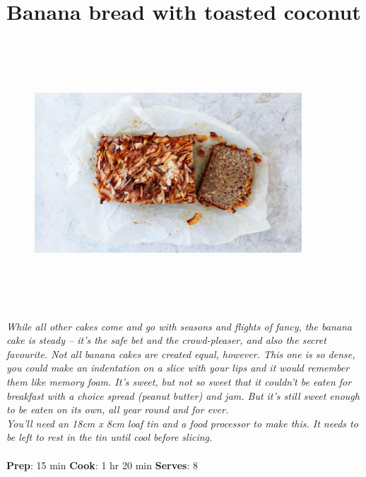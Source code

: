 \documentclass{book}
\begin{document}
\section{Banana bread with toasted coconut}
\begin{figure}
\centering\includegraphics[width=10cm,height=10cm,keepaspectratio]{Recipe_Pictures/Banana_bread_with_toasted_coconut.png}
\end{figure}
\emph{While all other cakes come and go with seasons and flights of fancy, the banana cake is steady – it’s the safe bet and the crowd-pleaser, and also the secret favourite. Not all banana cakes are created equal, however. This one is so dense, you could make an indentation on a slice with your lips and it would remember them like memory foam. It’s sweet, but not so sweet that it couldn’t be eaten for breakfast with a choice spread (peanut butter) and jam. But it’s still sweet enough to be eaten on its own, all year round and for ever.\\ 
You’ll need an 18cm x 8cm loaf tin and a food processor to make this. It needs to be left to rest in the tin until cool before slicing.}\\\\ 
\textbf{Prep}: 15 min
\textbf{Cook}: 1 hr 20 min
\textbf{Serves}: 8
\end{document}
